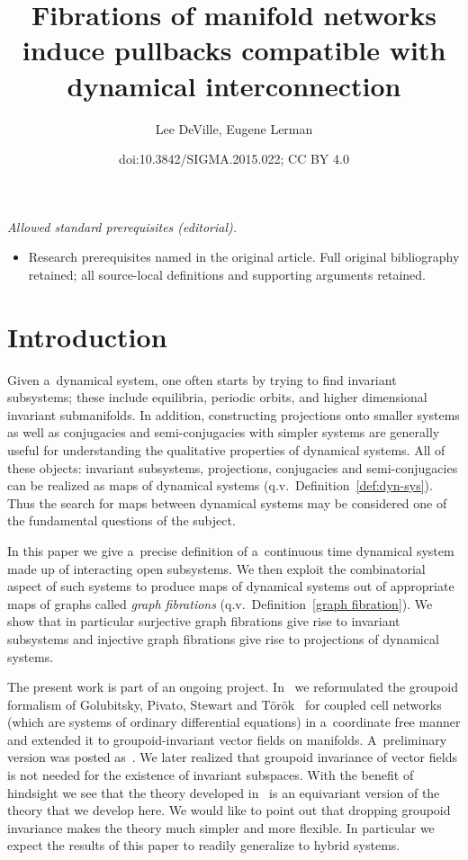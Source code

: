 \documentclass[10pt,a4paper]{amsart}
\title{Fibrations of manifold networks induce pullbacks compatible with dynamical interconnection}
\author{Lee DeVille, Eugene Lerman}
\date{doi:10.3842/SIGMA.2015.022; CC BY 4.0}
\numberwithin{equation}{section}
\begin{document}
\maketitle
\noindent\textit{Allowed standard prerequisites (editorial).}\begin{itemize}
\item Research prerequisites named in the original article. Full original bibliography retained; all source-local definitions and supporting arguments retained.
\end{itemize}\medskip
\section{Introduction}

Given a~dynamical system, one often starts by trying to f\/ind invariant subsystems; these include equilibria, periodic
orbits, and higher dimensional invariant submanifolds.
In addition, constructing projections onto smaller systems as well as conjugacies and semi-conjugacies with simpler
systems are generally useful for understanding the qualitative properties of dynamical systems.
All of these objects: invariant subsystems, projections, conjugacies and semi-conjugacies can be realized as maps of
dynamical systems (q.v.~Def\/inition~\ref{def:dyn-sys}).
Thus the search for maps between dynamical systems may be considered one of the fundamental questions of the subject.

In this paper we give a~precise def\/inition of a~continuous time dynamical system made up of interacting open subsystems.
We then exploit the combinatorial aspect of such systems to produce maps of dynamical systems out of appropriate maps of
graphs called {\it graph fibrations} (q.v.\ Def\/inition~\ref{graph fibration}).
We show that in particular surjective graph f\/ibrations give rise to invariant subsystems and injective graph f\/ibrations
give rise to projections of dynamical systems.

The present work is part of an ongoing project.
In~\cite{DL} we reformulated the groupoid formalism of Golubitsky, Pivato, Stewart and
T{\"o}r{\"o}k~\cite{Golubitsky.Stewart.Torok.05, Stewart.Golubitsky.Pivato.03} for coupled cell networks (which are
systems of ordinary dif\/ferential equations) in a~coordinate free manner and extended it to groupoid-invariant vector f\/ields on manifolds.
A~preliminary version was posted as~\cite{DLold}.
We later realized that groupoid invariance of vector f\/ields is not needed for the existence of invariant subspaces.
With the benef\/it of hindsight we see that the theory developed in~\cite{DL} is an equivariant version of the theory that
we develop here.
We would like to point out that dropping groupoid invariance makes the theory much simpler and more f\/lexible.
In particular we expect the results of this paper to readily generalize to hybrid systems.
\end{document}
